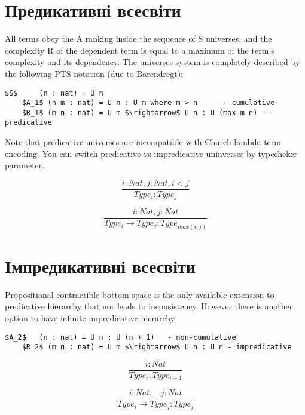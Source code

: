 \section{Предикативні всесвіти}

All terms obey the A ranking inside the sequence of S universes,
and the complexity R of the dependent term is equal to a maximum of
the term's complexity and its dependency.
The universes system is completely described by the following
PTS notation (due to Barendregt):

\begin{fullwidth}[width=\linewidth+4cm]
\hspace{-4cm}
\begin{lstlisting}[mathescape=true]
    $S$     (n : nat) = U n
    $A_1$ (n m : nat) = U n : U m where m > n      - cumulative
    $R_1$ (m n : nat) = U m $\rightarrow$ U n : U (max m n)  - predicative
\end{lstlisting}
\end{fullwidth}

Note that predicative universes are incompatible with Church lambda term encoding.
You can switch predicative vs impredicative uninverses by typecheker parameter.

\[
\tag{$A_1$}
\dfrac{i: Nat, j: Nat, i < j}{Type_i : Type_j}
\]

\[
\tag{$R_1$}
\dfrac{i : Nat, j : Nat}{Type_i \rightarrow Type_j : Type_{max(i,j)} }
\]

\newpage
\section{Імпредикативні всесвіти}
Propositional contractible bottom space is the only
available extension to predicative hierarchy that not leads to inconsistency.
However there is another option to have infinite
impredicative hierarchy.

\vspace{0.5cm}
\begin{lstlisting}[mathescape=true]
    $A_2$   (n : nat) = U n : U (n + 1)   - non-cumulative
    $R_2$ (m n : nat) = U m $\rightarrow$ U n : U n - impredicative
\end{lstlisting}

\begin{equation}
\tag{$A_2$}
\dfrac
{i: Nat}
{Type_i : Type_{i+1}}
\end{equation}

\begin{equation}
\tag{$R_2$}
\dfrac
{i : Nat,\ \ \ \ j : Nat}
{Type_i \rightarrow Type_{j} : Type_{j}}
\end{equation}

